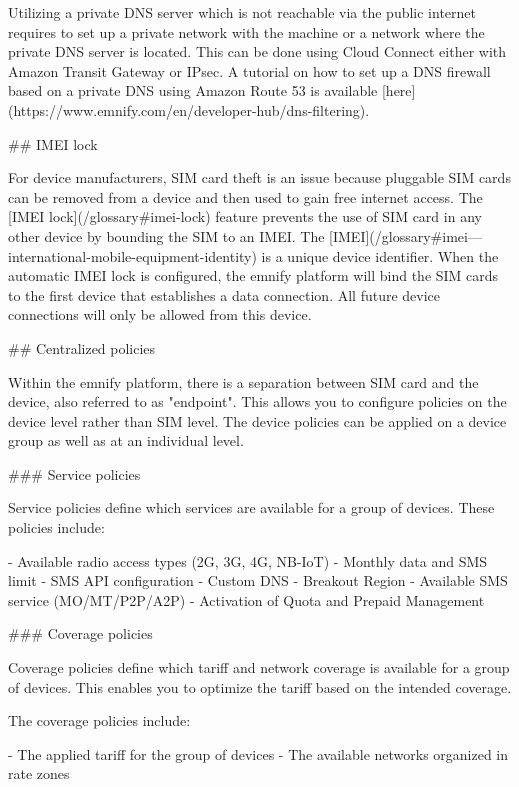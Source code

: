 \documentclass[11pt, oneside]{article}   	%
\newcommand{\addspace}{\vspace{2mm}}
\begin{document}
\begin{markdown}
Utilizing a private DNS server which is not reachable via the public internet requires to set up a private network with the machine or a network where the private DNS server is located.
This can be done using Cloud Connect either with Amazon Transit Gateway or IPsec.
A tutorial on how to set up a DNS firewall based on a private DNS using Amazon Route 53 is available [here](https://www.emnify.com/en/developer-hub/dns-filtering).

## IMEI lock

For device manufacturers, SIM card theft is an issue because pluggable SIM cards can be removed from a device and then used to gain free internet access.
The [IMEI lock](/glossary#imei-lock)  feature prevents the use of SIM card in any other device by bounding the SIM to an IMEI.
The [IMEI](/glossary#imei---international-mobile-equipment-identity) is a unique device identifier.
When the automatic IMEI lock is configured, the emnify platform will bind the SIM cards to the first device that establishes a data connection.
All future device connections will only be allowed from this device.

## Centralized policies

Within the emnify platform, there is a separation between SIM card and the device, also referred to as "endpoint".
This allows you to configure policies on the device level rather than SIM level.
The device policies can be applied on a device group as well as at an individual level.

### Service policies

Service policies define which services are available for a group of devices. These policies include:

\end{markdown}
\addspace
\begin{markdown}
- Available radio access types (2G, 3G, 4G, NB-IoT)
- Monthly data and SMS limit
- SMS API configuration
- Custom DNS
- Breakout Region
- Available SMS service (MO/MT/P2P/A2P)
- Activation of Quota and Prepaid Management
\end{markdown}
\addspace
\begin{markdown}

### Coverage policies

Coverage policies define which tariff and network coverage is available for a group of devices.
This enables you to optimize the tariff based on the intended coverage.

The coverage policies include:

\end{markdown}
\addspace
\begin{markdown}
- The applied tariff for the group of devices
- The available networks organized in rate zones
\end{markdown}
\end{document}
